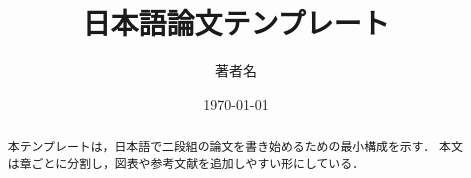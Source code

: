 \documentclass[uplatex,dvipdfmx,twocolumn]{jsarticle}
\title{日本語論文テンプレート}
\author{著者名}
\date{\today}
\begin{document}
\maketitle

\begin{abstract}
本テンプレートは，日本語で二段組の論文を書き始めるための最小構成を示す．
本文は章ごとに分割し，図表や参考文献を追加しやすい形にしている．
\end{abstract}











\end{document}
